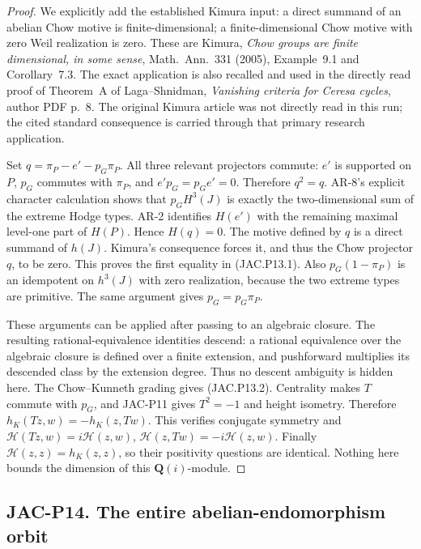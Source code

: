 \documentclass[11pt,a4paper]{article}
\providecommand{\mathscr}[1]{\mathcal{#1}}
\begin{document}
\begin{proof}
We explicitly add the established Kimura input: a direct summand
of an abelian Chow motive is finite-dimensional; a finite-dimensional
Chow motive with zero Weil realization is zero.
These are Kimura, \emph{Chow groups are finite dimensional, in some
sense}, Math.\ Ann.\ 331 (2005), Example~9.1 and Corollary~7.3.
The exact application is also recalled and used in the directly
read proof of Theorem~A of Laga--Shnidman,
\emph{Vanishing criteria for Ceresa cycles}, author PDF p.~8.
The original Kimura article was not directly read in this run;
the cited standard consequence is carried through that primary
research application.

Set $q=\pi_P-e'-p_G\pi_P$. All three relevant projectors commute:
$e'$ is supported on $P$, $p_G$ commutes with $\pi_P$, and
$e'p_G=p_Ge'=0$. Therefore $q^2=q$.
AR-8's explicit character calculation shows that $p_GH^3(J)$ is
exactly the two-dimensional sum of the extreme Hodge types.
AR-2 identifies $H(e')$ with the remaining maximal level-one
part of $H(P)$. Hence $H(q)=0$.
The motive defined by $q$ is a direct summand of $h(J)$.
Kimura's consequence forces it, and thus the Chow projector $q$,
to be zero. This proves the first equality in (JAC.P13.1).
Also $p_G(1-\pi_P)$ is an idempotent on $h^3(J)$ with zero
realization, because the two extreme types are primitive.
The same argument gives $p_G=p_G\pi_P$.

These arguments can be applied after passing to an algebraic
closure. The resulting rational-equivalence identities descend:
a rational equivalence over the algebraic closure is defined over
a finite extension, and pushforward multiplies its descended class
by the extension degree. Thus no descent ambiguity is hidden here.
The Chow--Kunneth grading gives (JAC.P13.2).
Centrality makes $T$ commute with $p_G$, and JAC-P11 gives
$T^2=-1$ and height isometry. Therefore
$h_K(Tz,w)=-h_K(z,Tw)$.
This verifies conjugate symmetry and
$\mathscr H(Tz,w)=i\mathscr H(z,w)$,
$\mathscr H(z,Tw)=-i\mathscr H(z,w)$.
Finally $\mathscr H(z,z)=h_K(z,z)$, so their positivity questions
are identical. Nothing here bounds the dimension of this
$\mathbf Q(i)$-module.
\end{proof}


\subsection*{JAC-P14. The entire abelian-endomorphism orbit}
\end{document}
